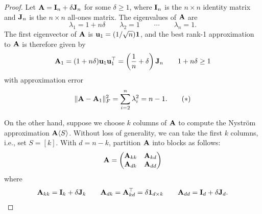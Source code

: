 \begin{proof}
Let $\mathbf{A} = \mathbf{I}_n + \delta\mathbf{J}_n$ for some $\delta \geq 1$, where $\mathbf{I}_n$ is the $n\times n$ identity matrix and $\mathbf{J}_n$ is the $n\times n$ all-ones matrix. The eigenvalues of $\mathbf{A}$ are 
\[\lambda_1 = 1+n\delta \qquad \lambda_2 = 1\qquad\cdots\qquad \lambda_n = 1.\]
The first eigenvector of $\mathbf{A}$ is $\mathbf{u}_1 = (1/\sqrt n)\mathbf{1}$, and the best rank-1 approximation to $\mathbf{A}$ is therefore given by
\[\mathbf{A}_1 = (1 + n\delta)\mathbf{u}_1\mathbf{u}_1^\top = \left(\frac{1}{n}+\delta\right)\mathbf{J}_n \qquad 1 + n\delta \geq 1\]
with approximation error
\begin{align*}
    \|\mathbf{A} - \mathbf{A}_1\|^2_F = \sum_{i=2}^n\lambda_i^2 =n-1.\tag{$\ast$}
\end{align*}

On the other hand, suppose we choose $k$ columns of $\mathbf{A}$ to compute the Nystr\"om approximation $\mathbf{A}\langle S\rangle$. Without loss of generality, we can take the first $k$ columns, i.e., set $S = [k]$. With $d = n-k$, partition $\mathbf{A}$ into blocks as follows:
\[\mathbf{A} = \begin{pmatrix}
    \mathbf{A}_{kk} & \mathbf{A}_{kd}\\
    \mathbf{A}_{dk} & \mathbf{A}_{dd}
\end{pmatrix}\]
where 
\[\mathbf{A}_{kk} = \mathbf{I}_k + \delta\mathbf{J}_k\qquad \mathbf{A}_{dk} = \mathbf{A}_{kd}^\top = \delta\mathbf{1}_{d\times k}\qquad \mathbf{A}_{dd} = \mathbf{I}_d + \delta\mathbf{J}_d.\]


\end{proof}
